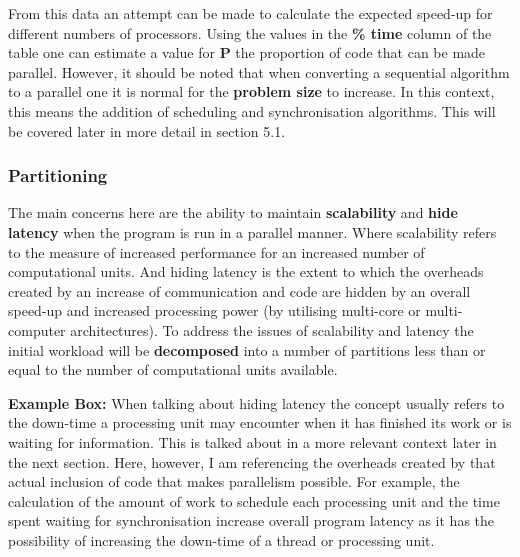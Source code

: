 \documentclass[11pt]{article} %
\begin{document}
From this data an attempt can be made to calculate the expected speed-up for different numbers of processors. Using the values in the {\bf \% time} column of the table one can estimate a value for {\bf P} the proportion of code that can be made parallel. However, it should be noted that when converting a sequential algorithm to a parallel one it is normal for the {\bf problem size} to increase. In this context, this means the addition of scheduling and synchronisation algorithms. This will be covered later in more detail in section 5.1.
\subsubsection*{Partitioning}
The main concerns here are the ability to maintain {\bf scalability} and {\bf hide latency} when the program is run in a parallel manner. Where scalability refers to the measure of increased performance for an increased number of computational units. And hiding latency is the extent to which the overheads created by an increase of communication and code are hidden by an overall speed-up and increased processing power (by utilising multi-core or multi-computer architectures). \cite[p78,79]{ref9} To address the issues of scalability and latency the initial workload will be {\bf decomposed} into a number of partitions less than or equal to the number of computational units available.\\
\begin{mdframed}
{\bf Example Box:} When talking about hiding latency the concept usually refers to the down-time a processing unit may encounter when it has finished its work or is waiting for information. This is talked about in a more relevant context later in the next section. Here, however, I am referencing the overheads created by that actual inclusion of code that makes parallelism possible. For example, the calculation of the amount of work to schedule each processing unit and the time spent waiting for synchronisation increase overall program latency as it has the possibility of increasing the down-time of a thread or processing unit.
\end{mdframed}
\bigskip
\end{document}
